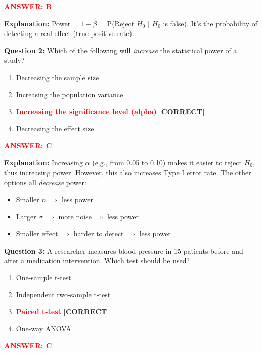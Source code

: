 \documentclass[11pt]{article}
\begin{document}
\textcolor{red}{\textbf{ANSWER: B}}

\textbf{Explanation:} Power = $1 - \beta$ = P(Reject $H_0$ $|$ $H_0$ is false). It's the probability of detecting a real effect (true positive rate).

\vspace{0.5cm}

\textbf{Question 2:} Which of the following will \textit{increase} the statistical power of a study?

\begin{enumerate}[label=\Alph*.]
\item Decreasing the sample size
\item Increasing the population variance
\item \textcolor{red}{\textbf{Increasing the significance level (alpha)}} \textbf{[CORRECT]}
\item Decreasing the effect size
\end{enumerate}

\textcolor{red}{\textbf{ANSWER: C}}

\textbf{Explanation:} Increasing $\alpha$ (e.g., from 0.05 to 0.10) makes it easier to reject $H_0$, thus increasing power. However, this also increases Type I error rate. The other options all \textit{decrease} power:
\begin{itemize}
\item Smaller $n$ $\Rightarrow$ less power
\item Larger $\sigma$ $\Rightarrow$ more noise $\Rightarrow$ less power
\item Smaller effect $\Rightarrow$ harder to detect $\Rightarrow$ less power
\end{itemize}

\vspace{0.5cm}

\textbf{Question 3:} A researcher measures blood pressure in 15 patients before and after a medication intervention. Which test should be used?

\begin{enumerate}[label=\Alph*.]
\item One-sample t-test
\item Independent two-sample t-test
\item \textcolor{red}{\textbf{Paired t-test}} \textbf{[CORRECT]}
\item One-way ANOVA
\end{enumerate}

\textcolor{red}{\textbf{ANSWER: C}}
\end{document}
